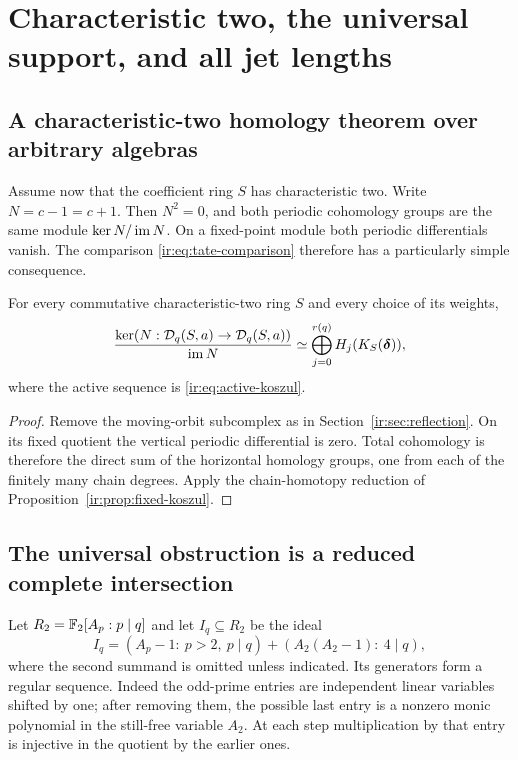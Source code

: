 \section{Characteristic two, the universal support, and all jet lengths}
\label{ir:sec:modular}

\subsection{A characteristic-two homology theorem over arbitrary algebras}
Assume now that the coefficient ring $S$ has characteristic two.
Write $N=c-1=c+1$. Then $N^2=0$, and both periodic cohomology
groups are the same module $\ker N/\operatorname{im} N$. On a fixed-point module
both periodic differentials vanish. The comparison
\eqref{ir:eq:tate-comparison} therefore has a particularly simple
consequence.

\begin{theorem}
\label{ir:thm:char2-koszul}
For every commutative characteristic-two ring $S$ and every choice
of its weights,
\begin{equation}\label{ir:eq:char2-homology}
 \frac{\ker(N:\mathcal D_q(S,a)\to\mathcal D_q(S,a))}{\operatorname{im} N}
 \simeq\bigoplus_{j=0}^{r(q)}H_j(K_S(\boldsymbol\delta)),
\end{equation}
where the active sequence is \eqref{ir:eq:active-koszul}.
\end{theorem}
\begin{proof}
Remove the moving-orbit subcomplex as in
Section~\ref{ir:sec:reflection}. On its fixed quotient the vertical
periodic differential is zero. Total cohomology is therefore the
direct sum of the horizontal homology groups, one from each of the
finitely many chain degrees. Apply the chain-homotopy reduction of
Proposition~\ref{ir:prop:fixed-koszul}.
\end{proof}

\subsection{The universal obstruction is a reduced complete intersection}
Let $R_2=\mathbb F_2[A_p:p\mid q]$ and let $I_q\subseteq R_2$ be the ideal
\begin{equation}\label{ir:eq:universal-ideal}
 I_q=(A_p-1:\ p>2,\ p\mid q)
       +(A_2(A_2-1):\ 4\mid q),
\end{equation}
where the second summand is omitted unless indicated. Its generators
form a regular sequence. Indeed the odd-prime entries are independent
linear variables shifted by one; after removing them, the possible
last entry is a nonzero monic polynomial in the still-free variable
$A_2$. At each step multiplication by that entry is injective in the
quotient by the earlier ones.

